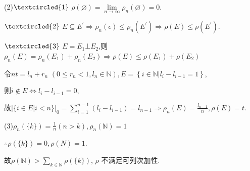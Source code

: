 \begin{solution}

(2)\quad$\textcircled{1}$ $\rho(\varnothing)=\lim\limits_{n\to\infty}\rho_{n}(\varnothing)=0.$

$\textcircled{2}$ $E\subseteq E^{\prime}\Rightarrow \rho_{n}(\epsilon)
\leqslant \rho_{n}(E^{\prime})\Rightarrow \rho(E)\leqslant \rho(E^{\prime}).$

$\textcircled{3}$ $E=E_{1}\bot E_{2}$,则$\rho_{n}(E)=\rho_{n}(E_{1})+\rho_{n}(E_{2})\Rightarrow \rho(E)\leqslant \rho(E_{1})+\rho(E_{2})$

令$nt=l_{n}+r_{n}$ $(0\leqslant r_{n}<1,l_{n}\in\mathbb{N}),E=\left\{i\in \mathbb{N}|l_{i}-l_{i-1}=1\right\}$,

则$i\notin E\Leftrightarrow l_{i}-l_{i-1}=0$,

故$|\{i\in E|i<n\}|_0=\sum\limits_{i=1}^{n-1}(l_{i}-l_{i-1})=l_{n-1}\Rightarrow \rho_{n}(E)=\frac{l_{n-1}}{n},\rho(E)=t.$

(3)\quad$\rho_{n}(\{k\})=\frac{1}{n}(n>k),\rho_{n}(\mathbb{N})=1$

$\therefore \rho(\{k\})=0,\rho(N)=1.$

故$\rho(\mathbb{N})>\sum\limits_{k\in \mathbb{N}}\rho(\{k\})$, $\rho$ 不满足可列次加性.
\end{solution}


